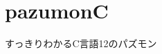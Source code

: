 \chapter{pazumonC}
\hypertarget{md_README}{}\label{md_README}
\label{md_README_autotoc_md0}%
%
すっきりわかる\+C言語12のパズモン 